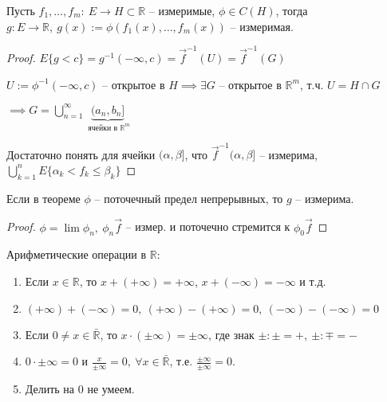 \begin{theorem}
    Пусть $f_1, \dots, f_m: \ E \rightarrow H \subset \mathbb{R}$ -- измеримые,  $\phi \in C(H)$, тогда $g: E \rightarrow \mathbb{R}, \ g(x) := \phi(f_1(x), \dots, f_m(x))$ -- измеримая.
\end{theorem}
\begin{proof}
    $E \{ g < c \} = g^{-1}(-\infty, c) = \vec{f}^{-1}(U) = \vec{f}^{-1} (G)$
    
    $U := \phi^{-1}(-\infty, c)$ -- открытое в $H \implies \exists G$ --  открытое в $\mathbb{R}^{m}$, т.ч. $U = H \cap G$

    $\implies G = \bigcup_{n=1}^{\infty} \underbrace{(a_n, b_n]}_{\text{ ячейки в } \mathbb{R}^m}$

    Достаточно понять для ячейки $(\alpha, \beta]$, что $\vec{f}^{-1} (\alpha, \beta]$ -- измерима, $\bigcup_{k=1}^{n} E \{ \alpha_k < f_k \leq \beta_k \}$

\end{proof}

\begin{consequence}
    Если в теореме $\phi$ -- поточечный предел непрерывных, то $g$ -- измерима.
\end{consequence}
\begin{proof}
    $\phi = \lim \phi_n, \ \phi_n \vec{f}$ -- измер. и поточечно стремится к $\phi_0 \vec{f}$
\end{proof}



Арифметические операции в $\mathbb{R}$:

\begin{enumerate}
    \item Если $x \in \mathbb{R}$, то $x + (+\infty) = +\infty$, $x + (-\infty) = -\infty$ и т.д.
    \item $(+\infty) +(-\infty) = 0, \ (+\infty) - (+\infty) = 0, \ (-\infty) - (-\infty) = 0$
    \item Если $0 \not = x \in \bar{\mathbb{R}}$, то $x \cdot (\pm \infty) = \pm \infty$, где знак $\pm : \pm = +, \ \pm : \mp = -$
    \item $0 \cdot \pm \infty = 0$ и $\frac{x}{\pm \infty} = 0, \ \forall x \in \bar{\mathbb{R}}$, т.е. $\frac{\pm \infty}{ \pm \infty} = 0$.
    \item Делить на 0 не умеем.
\end{enumerate}

